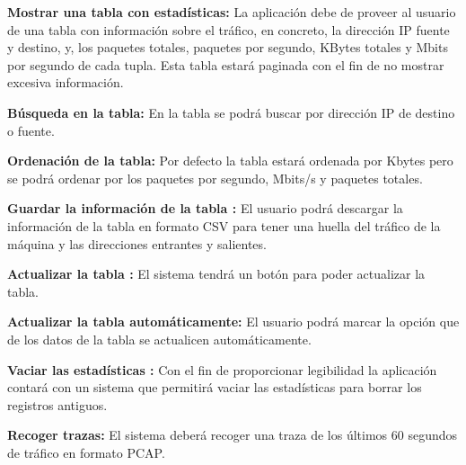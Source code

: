 \begin{functional}
        \setcounter{enumi}{5}
        
        \item \textbf{Mostrar una tabla con estadísticas:} La aplicación debe de proveer al usuario de una tabla con información sobre el tráfico, en concreto, la dirección IP fuente y destino, y, los paquetes totales, paquetes por segundo, KBytes totales y Mbits por segundo de cada tupla. Esta tabla estará paginada con el fin de no mostrar excesiva información.
        \begin{functional}
        \item \textbf{Búsqueda en la tabla:} En la tabla se podrá buscar por dirección IP de destino o fuente. 
        \item \textbf{Ordenación de la tabla:} Por defecto la tabla estará ordenada por Kbytes pero se podrá ordenar por los paquetes por segundo, Mbits/s y paquetes totales.
        \item \textbf{Guardar la información de la tabla :} El usuario podrá descargar la información de la tabla en formato CSV para tener una huella del tráfico de la máquina y las direcciones entrantes y salientes.
        \item \textbf{Actualizar la tabla :} El sistema tendrá un botón para poder actualizar la tabla.
        \item \textbf{Actualizar la tabla automáticamente:} El usuario podrá marcar la opción que de los datos de la tabla se actualicen automáticamente.
        \item \textbf{Vaciar las estadísticas :} Con el fin de proporcionar legibilidad la aplicación contará con un sistema que permitirá vaciar las estadísticas para borrar los registros antiguos.
        \end{functional}
        \item \textbf{Recoger trazas:} El sistema deberá recoger una traza de los últimos 60 segundos de tráfico en formato PCAP. 
\end{functional}
